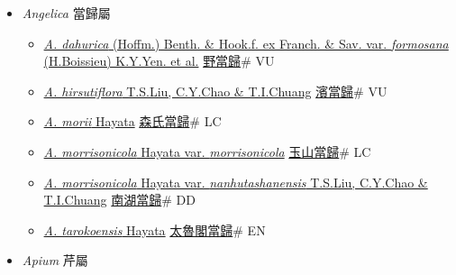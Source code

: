 
  \begin{itemize}
 \item[] \textit{Angelica} 當歸屬
                    
  \begin{itemize}
        \item[] \href{http://www.theplantlist.org/tpl1.1/search?q=Angelica+dahurica+var.+formosana}{\textit{A. dahurica} (Hoffm.) Benth. \& Hook.f. ex Franch. \& Sav. var. \textit{formosana} (H.Boissieu) K.Y.Yen. et al.}   \href{\detokenize{http://taibnet.sinica.edu.tw/chi/taibnet_species_list.php?T2=野當歸&T2_new_value=true&fr=y}}{野當歸}\# VU
        \item[] \href{http://www.theplantlist.org/tpl1.1/search?q=Angelica+hirsutiflora}{\textit{A. hirsutiflora} T.S.Liu, C.Y.Chao \& T.I.Chuang}   \href{\detokenize{http://taibnet.sinica.edu.tw/chi/taibnet_species_list.php?T2=濱當歸&T2_new_value=true&fr=y}}{濱當歸}\# VU
        \item[] \href{http://www.theplantlist.org/tpl1.1/search?q=Angelica+morii}{\textit{A. morii} Hayata}   \href{\detokenize{http://taibnet.sinica.edu.tw/chi/taibnet_species_list.php?T2=森氏當歸&T2_new_value=true&fr=y}}{森氏當歸}\# LC
        \item[] \href{http://www.theplantlist.org/tpl1.1/search?q=Angelica+morrisonicola+var.+morrisonicola}{\textit{A. morrisonicola} Hayata var. \textit{morrisonicola}}   \href{\detokenize{http://taibnet.sinica.edu.tw/chi/taibnet_species_list.php?T2=玉山當歸&T2_new_value=true&fr=y}}{玉山當歸}\# LC
        \item[] \href{http://www.theplantlist.org/tpl1.1/search?q=Angelica+morrisonicola+var.+nanhutashanensis}{\textit{A. morrisonicola} Hayata var. \textit{nanhutashanensis} T.S.Liu, C.Y.Chao \& T.I.Chuang}   \href{\detokenize{http://taibnet.sinica.edu.tw/chi/taibnet_species_list.php?T2=南湖當歸&T2_new_value=true&fr=y}}{南湖當歸}\# DD
        \item[] \href{http://www.theplantlist.org/tpl1.1/search?q=Angelica+tarokoensis}{\textit{A. tarokoensis} Hayata}   \href{\detokenize{http://taibnet.sinica.edu.tw/chi/taibnet_species_list.php?T2=太魯閣當歸&T2_new_value=true&fr=y}}{太魯閣當歸}\# EN
  \end{itemize}
 \item[] \textit{Apium} 芹屬
                    

\end{itemize}
